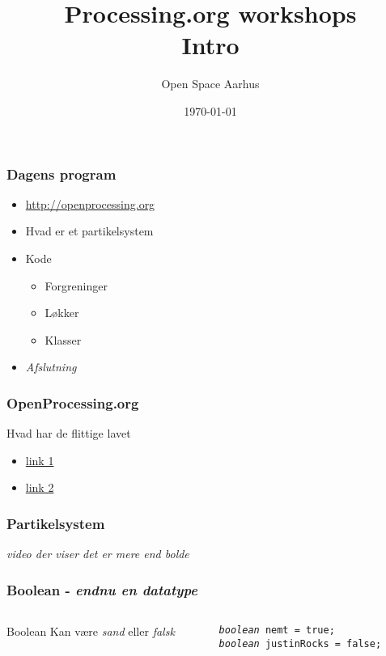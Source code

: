 \documentclass{beamer}
\title{Processing.org workshops\\Intro}
\author{Open Space Aarhus}
\date{\today}
\institute[Bryggervej 30]{Bryggervej 30, 8240 Århus N}
\begin{document}
\begin{frame}[label=titlepage]
  \titlepage
\end{frame}

\begin{frame}
  \frametitle{Dagens program}
  \begin{itemize}
  \item \url{http://openprocessing.org}
  \item Hvad er et partikelsystem
  \item Kode
    \begin{itemize}
    \item Forgreninger
    \item Løkker
    \item Klasser
    \end{itemize}

  \item \emph{Afslutning}
    
  \end{itemize}						
\end{frame}


\begin{frame}
  \frametitle{OpenProcessing.org}
  \begin{block}{Hvad har de flittige lavet}
    \begin{itemize}
    \item \url{link 1}
    \item \url{link 2}
    \end{itemize}
  \end{block}
\end{frame}



\begin{frame}
  \frametitle{Partikelsystem}
  
  \emph{video der viser det er mere end bolde}

\end{frame}


\begin{frame}[fragile]
  \frametitle{Boolean - \emph{endnu en datatype}}
  \begin{columns}
    \begin{column}{0.4\textwidth}
      \begin{block}{Boolean}
        Kan være \emph{sand} eller \emph{falsk}
      \end{block}
    \end{column}
    \begin{column}{0.6\textwidth}    
      \texttt{\emph{boolean} nemt = true; }\\
      \texttt{\emph{boolean} justinRocks = false; }
    \end{column}
  \end{columns}  
\end{frame}
\end{document}
